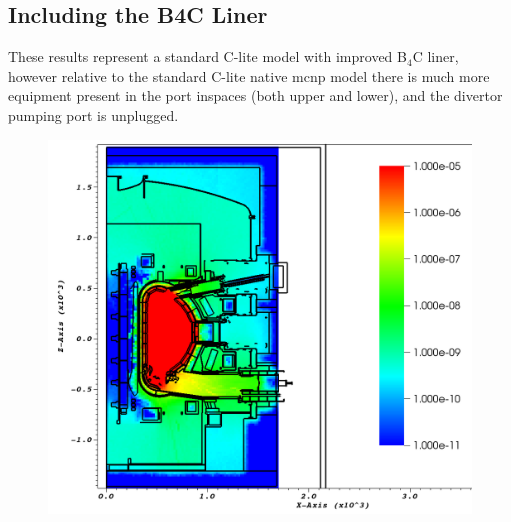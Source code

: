 \documentclass[12pt]{article}
\begin{document}
\subsection{Including the B4C Liner}
These results represent a standard C-lite model with improved B$_4$C liner,
however relative to the standard C-lite native \gls{mcnp} model there is much more
equipment present in the port inspaces (both upper and lower), and the divertor
pumping port is unplugged. 
\begin{figure}[ht!]
  \centering
  \includegraphics[scale=0.35]{../plots/neutron/b4c/flux_y0.png}     

\end{figure}
\end{document}

